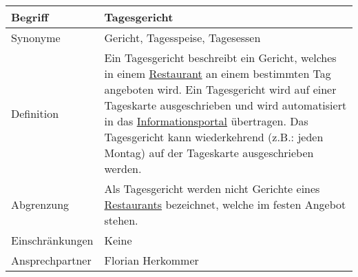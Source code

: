 \begin{table}[H]
    \centering
    \label{gls:tagesgericht}
    \begin{tabularx}{\textwidth}{| l | X |}
        \hline
        Begriff         & Tagesgericht                                                                                                                                                                                                                                                                                                                                                                                         \\
        \hline
        Synonyme        & Gericht, Tagesspeise, Tagesessen                                                                                                                                                                                                                                                                                                                                                                     \\
        \hline
        Definition      & Ein Tagesgericht beschreibt ein Gericht, welches in einem \hyperref[gls:restaurant]{Restaurant} an einem bestimmten Tag angeboten wird. Ein Tagesgericht wird auf einer Tageskarte ausgeschrieben und wird automatisiert in das \hyperref[gls:informationsportal]{Informationsportal} übertragen. Das Tagesgericht kann wiederkehrend (z.B.: jeden Montag) auf der Tageskarte ausgeschrieben werden. \\
        \hline
        Abgrenzung      & Als Tagesgericht werden nicht Gerichte eines \hyperref[gls:restaurant]{Restaurants} bezeichnet, welche im festen Angebot stehen.                                                                                                                                                                                                                                                                     \\
        \hline
        Einschränkungen & Keine                                                                                                                                                                                                                                                                                                                                                                                                \\
        \hline
        Ansprechpartner & Florian Herkommer                                                                                                                                                                                                                                                                                                                                                                                    \\

\end{tabularx}
\end{table}
